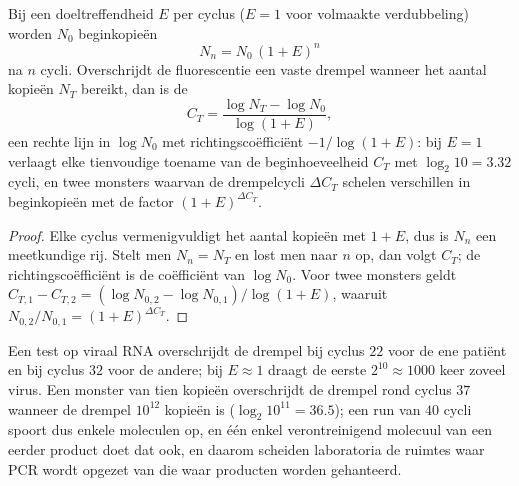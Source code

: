 \begin{theorem}\label{thm:b3:genetic-engineering:pcr}
Bij een doeltreffendheid $E$ per cyclus ($E = 1$ voor volmaakte
verdubbeling) worden $N_{0}$ beginkopieën
\[
N_{n} = N_{0}\,(1 + E)^{n}
\]
na $n$ cycli. Overschrijdt de fluorescentie een vaste drempel wanneer
het aantal kopieën $N_{T}$ bereikt, dan is de \emph{}
\[
C_{T} = \frac{\log N_{T} - \log N_{0}}{\log(1 + E)},
\]
een rechte lijn in $\log N_{0}$ met richtingscoëfficiënt
$-1/\log(1+E)$: bij $E = 1$ verlaagt elke tienvoudige toename van de
beginhoeveelheid $C_{T}$ met $\log_{2} 10 = 3.32$ cycli, en twee
monsters waarvan de drempelcycli $\Delta C_{T}$ schelen verschillen in
beginkopieën met de factor $(1 + E)^{\Delta C_{T}}$.
\end{theorem}
\begin{proof}
Elke cyclus vermenigvuldigt het aantal kopieën met $1 + E$, dus is
$N_{n}$ een meetkundige rij. Stelt men $N_{n} = N_{T}$ en lost men naar
$n$ op, dan volgt $C_{T}$; de richtingscoëfficiënt is de coëfficiënt
van $\log N_{0}$. Voor twee monsters geldt
$C_{T,1} - C_{T,2} = (\log N_{0,2} - \log N_{0,1})/\log(1+E)$, waaruit
$N_{0,2}/N_{0,1} = (1+E)^{\Delta C_{T}}$.
\end{proof}

\begin{example}\label{ex:b3:genetic-engineering:qpcr}
Een test op viraal RNA overschrijdt de drempel bij cyclus $22$ voor de
ene patiënt en bij cyclus $32$ voor de andere; bij $E \approx 1$ draagt
de eerste $2^{10}
\approx 1000$ keer zoveel virus. Een monster van tien kopieën
overschrijdt de drempel rond cyclus $37$ wanneer de drempel $10^{12}$
kopieën is ($\log_{2} 10^{11} =
36.5$); een run van $40$ cycli spoort dus enkele moleculen op, en één
enkel verontreinigend molecuul van een eerder product doet dat ook, en
daarom scheiden laboratoria de ruimtes waar PCR wordt opgezet van die
waar producten worden gehanteerd.
\end{example}


